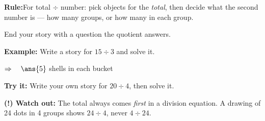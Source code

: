 \documentclass[12pt]{article}
\begin{document}

\begin{formulabox}
\textbf{Rule:}\quad For total $\div$ number: pick objects for the \emph{total}, then decide what the second number is --- how many groups, or how many in each group.\par
End your story with a question the quotient answers.
\end{formulabox}

\begin{examplebox}
\textbf{Example:} Write a story for $15 \div 3$ and solve it.

$\Rightarrow\quad\ans{5}$ shells in each bucket
\end{examplebox}

\begin{tryitbox}
\textbf{Try it:} Write your own story for $20 \div 4$, then solve it.\\[2pt]
\end{tryitbox}

\begin{watchoutbox}
\textbf{(!) Watch out:} The total always comes \emph{first} in a division equation. A drawing of 24 dots in 4 groups shows $24 \div 4$, never $4 \div 24$.
\end{watchoutbox}
\end{document}
